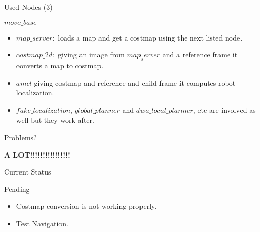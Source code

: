 \documentclass[14pt]{beamer}
\begin{document}
\begin{frame}{Used Nodes (3)}
    \begin{alertblock}{$move\_base$}
    		\begin{itemize}
    		    			\item $map\_server: $ loads a map and get a costmap using the next listed node.
    			\item $costmap\_2d: $ giving an image from $map_server$ and a reference frame it converts a map to costmap.
    			\item $amcl$ giving costmap and reference and child frame it computes robot localization.

    			\item $fake\_localization$, $global\_planner$ and $dwa\_local\_planner$, etc are involved as well but they work after.
        \end{itemize}
    \end{alertblock}    
\end{frame}

\begin{frame}{Problems?}
	\begin{center}
		\LARGE \textsc{\textbf{A LOT!!!!!!!!!!!!!!!!}}	
	\end{center}
\end{frame}

\begin{frame}{Current Status}
    \begin{alertblock}{Pending}
    		\begin{itemize}
		\item Costmap conversion is not working properly.
		\item Test Navigation.
        \end{itemize}   
    \end{alertblock}
\end{frame}

\end{document}
